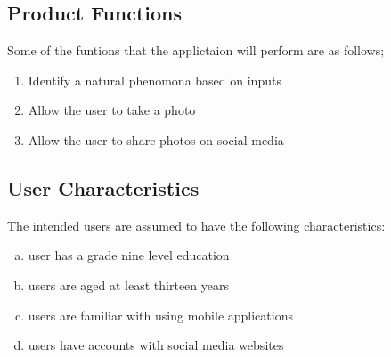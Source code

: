 \documentclass[]{article}
\begin{document}
\subsection{Product Functions}
\label{sub:product_functions}
Some of the funtions that the applictaion will perform are as follows;
\begin{enumerate}
\item Identify a natural phenomona based on inputs
\item Allow the user to take a photo
\item Allow the user to share photos on social media
\end{enumerate}

\subsection{User Characteristics}
\label{sub:user_characteristics}
The intended users are assumed to have the following characteristics:
\begin{enumerate}[a)]
	\item user has a grade nine level education
	\item users are aged at least thirteen years
	\item users are familiar with using mobile applications
	\item users have accounts with social media websites 
	  
\end{enumerate}
\end{document}
